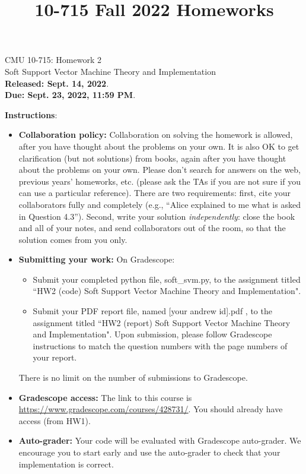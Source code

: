 \documentclass{article}
\title{10-715 Fall 2022 Homeworks}
\begin{document}
\begin{center}
{\Large CMU 10-715: Homework 2}\\
Soft Support Vector Machine Theory and Implementation \\
{\bf Released: Sept. 14, 2022}.\\
{\bf Due: Sept. 23, 2022, 11:59 PM}.\\
\end{center}


\textbf{\large Instructions}:
\begin{itemize}
    \item \textbf{Collaboration policy:} Collaboration on solving the homework is allowed, after you have thought about the problems on your own. It is also OK to get clarification (but not solutions) from books, again after you have thought about the problems on your own. Please don’t search for answers on the web, previous years’ homeworks, etc. (please ask the TAs if you are not sure if you can use a particular reference). There are two requirements: first, cite your collaborators fully and completely (e.g., ``Alice explained to me what is asked in Question 4.3''). Second, write your solution \emph{independently}: close the book and all of your notes, and send collaborators out of the room, so that the solution comes from you only. 
    
    \item \textbf{Submitting your work:} On Gradescope:
    \begin{itemize}
        \item Submit your completed python file, soft\_svm.py, to the assignment titled ``HW2 (code) Soft Support Vector Machine Theory and Implementation".
        \item Submit your PDF report file, named [your andrew id].pdf , to the assignment titled ``HW2 (report) Soft Support Vector Machine Theory and Implementation". Upon submission, please follow Gradescope instructions to match the question numbers with the page numbers of your report. 
    \end{itemize}
    There is no limit on the number of submissions to Gradescope. 
    
    \item \textbf{Gradescope access:} The link to this course is \url{https://www.gradescope.com/courses/428731/}. You should already have access (from HW1).
    
    \item \textbf{Auto-grader:} Your code will be evaluated with Gradescope auto-grader. We encourage you to start early and use the auto-grader to check that your implementation is correct.
    

\end{itemize}
\end{document}
